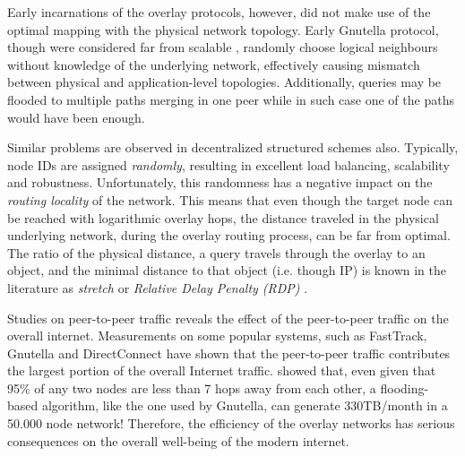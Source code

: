 \documentclass[acmcsur]{acmtrans2m}
\begin{document}
Early incarnations of the overlay protocols, however, did not make use of the optimal
mapping with the physical network topology. Early Gnutella protocol, though were
considered far from scalable \cite{ritter_gnucantscale_2001}, randomly choose
logical neighbours without knowledge of the underlying network, effectively
causing mismatch between physical and application-level topologies.
Additionally, queries may be flooded to multiple paths merging in one peer while
in such case one of the paths would have been enough. 

Similar problems are observed in decentralized structured schemes also.
Typically, node IDs are assigned \emph{randomly}, resulting in excellent load
balancing, scalability and robustness.  Unfortunately, this randomness has a
negative impact on the \emph{routing locality} of the network. This means that
even though the target node can be reached with logarithmic overlay hops, the
distance traveled in the physical underlying network, during the overlay routing
process, can be far from optimal.  The ratio of the physical distance, a query
travels through the overlay to an object, and the minimal distance to that
object (i.e. though IP) is known in the literature as \emph{stretch} or
\emph{Relative Delay Penalty (RDP)} \cite{chu_esm_2000}.

Studies on peer-to-peer traffic reveals the effect of the peer-to-peer traffic
on the overall internet.  Measurements
\cite{seroiu_analysiscds_2002,sen_analyzep2ptraffic_2004} on some popular
systems, such as FastTrack, Gnutella and DirectConnect have shown that the
peer-to-peer traffic contributes the largest portion of the overall Internet
traffic.  \cite{matei_mapgnutella_2002} showed that, even given that 95\% of any
two nodes are less than 7 hops away from each other, a flooding-based algorithm,
like the one used by Gnutella, can generate 330TB/month in a 50.000 node
network!  Therefore, the efficiency of the overlay networks has serious
consequences on the overall well-being of the modern internet. 
\end{document}
